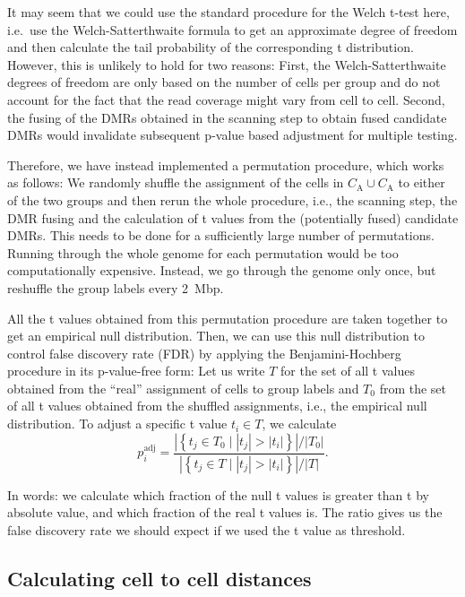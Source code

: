 \documentclass[10pt]{article}
\begin{document}
It may seem that we could use the standard procedure for the Welch t-test here, i.e.\ use the Welch-Satterthwaite formula to get an approximate degree of freedom and then calculate the tail probability of the corresponding t distribution.
However, this is unlikely to hold for two reasons:
First, the Welch-Satterthwaite degrees of freedom are only based on the number of cells per group and do not account for the fact that the read coverage might vary from cell to cell.
Second, the fusing of the DMRs obtained in the scanning step to obtain fused candidate DMRs would invalidate subsequent p-value based adjustment for multiple testing.

Therefore, we have instead implemented a permutation procedure, which works as follows:
We randomly shuffle the assignment of the cells in $C_\text{A}\cup C_\text{A}$ to either of the two groups and then rerun the whole procedure, i.e., the scanning step, the DMR fusing and the calculation of t values from the (potentially fused) candidate DMRs.
This needs to be done for a sufficiently large number of permutations.
Running through the whole genome for each permutation would be too computationally expensive.
Instead, we go through the genome only once, but reshuffle the group labels every 2~Mbp.

All the t values obtained from this permutation procedure are taken together to get an empirical null distribution.
Then, we can use this null distribution to control false discovery rate (FDR) by applying the Benjamini-Hochberg procedure in its p-value-free form:
Let us write $T$ for the set of all t values obtained from the ``real'' assignment of cells to group labels and $T_0$ from the set of all t values obtained from the shuffled assignments, i.e., the empirical null distribution.
To adjust a specific t value $t_i\in T$, we calculate
\[ p^\text{adj}_i = \frac{ \left|\left\{t_j\in T_0\mid|t_j| > |t_i| \right\}\right| \big/ |T_0|}
{ \left|\left\{t_j\in T\mid|t_j| > |t_i| \right\}\right| \big/ |T|}.\]

In words: we calculate which fraction of the null t values is greater than t by absolute value, and which fraction of the real t values is.
The ratio gives us the false discovery rate we should expect if we used the t value as threshold.


\subsection*{Calculating cell to cell distances}
\end{document}

